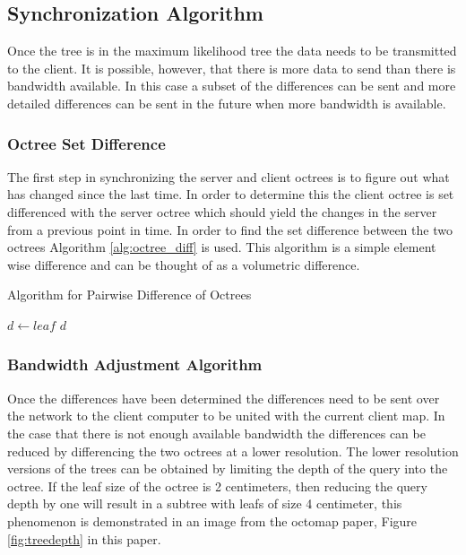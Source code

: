 \documentclass[journal]{IEEEtran}
\begin{document}
  \subsection{Synchronization Algorithm}
  Once the tree is in the maximum likelihood tree the data needs to be
  transmitted to the client. It is possible, however, that there is more data
  to send than there is bandwidth available. In this case a subset of the
  differences can be sent and more detailed differences can be sent in the
  future when more bandwidth is available.
  
  \subsubsection{Octree Set Difference}
  The first step in synchronizing the server and client octrees is to figure
  out what has changed since the last time. In order to determine this the
  client octree is set differenced with the server octree which should yield
  the changes in the server from a previous point in time. In order to find
  the set difference between the two octrees Algorithm \ref{alg:octree_diff}
  is used. This algorithm is a simple element wise difference and can be
  thought of as a volumetric difference.
  
  \begin{algorithm}
  \caption{Algorithm for Pairwise Difference of Octrees}
  \label{alg:octree_diff}
  \begin{algorithmic}
    \STATE {}
    \STATE {}
    \STATE {}
        \STATE $d\gets leaf$
      \ENDIF
    \ENDFOR
    \RETURN $d$
  \end{algorithmic}
  \end{algorithm}
  
  \subsubsection{Bandwidth Adjustment Algorithm}
  Once the differences have been determined the differences need to be sent
  over the network to the client computer to be united with the current client
  map. In the case that there is not enough available bandwidth the
  differences can be reduced by differencing the two octrees at a lower
  resolution. The lower resolution versions of the trees can be obtained by
  limiting the depth of the query into the octree. If the leaf size of the
  octree is 2 centimeters, then reducing the query depth by one will result in
  a subtree with leafs of size 4 centimeter, this phenomenon is demonstrated
  in an image from the octomap paper, Figure \ref{fig:treedepth} in this
  paper.
  
\end{document}
